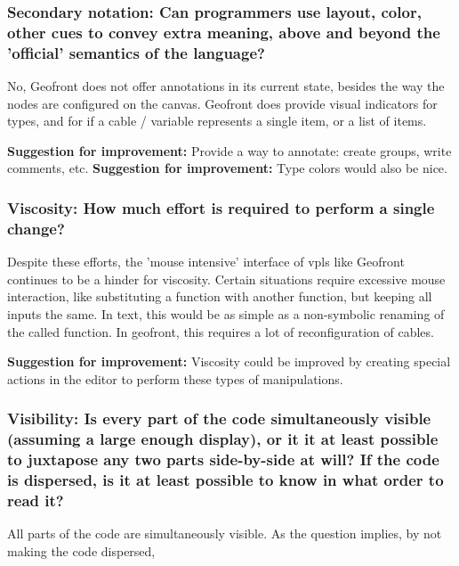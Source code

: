 \subsubsection*{Secondary notation: Can programmers use layout, color, other cues to convey extra meaning, above and beyond the 'official' semantics of the language?}

No, Geofront does not offer annotations in its current state, besides the way the nodes are configured on the canvas.  
Geofront does provide visual indicators for types, and for if a cable / variable represents a single item, or a list of items.

\textbf{Suggestion for improvement:} Provide a way to annotate: create groups, write comments, etc. 
\textbf{Suggestion for improvement:} Type colors would also be nice.

\subsubsection*{Viscosity: How much effort is required to perform a single change?}

Despite these efforts, the 'mouse intensive' interface of vpls like Geofront continues to be a hinder for viscosity.
Certain situations require excessive mouse interaction, like substituting a function with another function, but keeping all inputs the same.
In text, this would be as simple as a non-symbolic renaming of the called function.
In geofront, this requires a lot of reconfiguration of cables. 

\textbf{Suggestion for improvement:} Viscosity could be improved by creating special actions in the editor to perform these types of manipulations.  


\subsubsection*{Visibility: Is every part of the code simultaneously visible (assuming a large enough display), or it it at least possible to juxtapose any two parts side-by-side at will? If the code is dispersed, is it at least possible to know in what order to read it?}

All parts of the code are simultaneously visible. 
As the question implies, by not making the code dispersed, 



